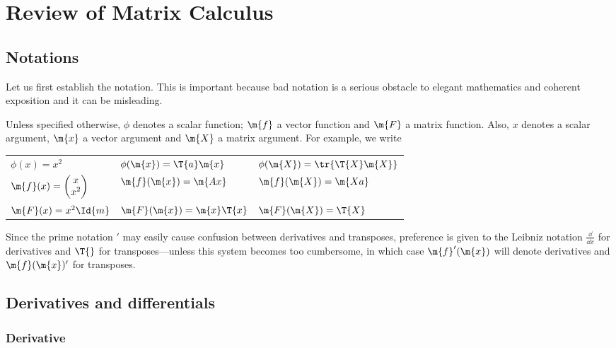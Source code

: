 \chapter{Review of Matrix Calculus}

\section{Notations}

Let us first establish the notation. This is important because bad notation is a serious obstacle to elegant mathematics and coherent exposition and it can be misleading.

Unless specified otherwise, $\phi$ denotes a scalar function; $\m{f}$ a vector function and $\m{F}$ a matrix function. Also, $x$ denotes a scalar argument, $\m{x}$ a vector argument and $\m{X}$ a matrix argument. For example, we write

\begin{table*}[h]
  \begin{center}
  \begin{tabular}{lll}
    $\phi(x)=x^2$     &$\phi(\m{x})=\T{a}\m{x}$       &$\phi(\m{X})=\tr{\T{X}\m{X}}$\\
    $\m{f}(x)=
      \begin{pmatrix}
        x\\
        x^2
      \end{pmatrix}$    &$\m{f}(\m{x})=\m{Ax}$    &$\m{f}(\m{X})=\m{Xa}$\\
      $\m{F}(x)=x^2\Id{m}$  &$\m{F}(\m{x})=\m{x}\T{x}$  &$\m{F}(\m{X})=\T{X}$
  \end{tabular}
\end{center}
\end{table*}

Since the prime notation $'$ may easily cause confusion between derivatives and transposes, preference is given to the Leibniz notation $\frac{\dd}{\dd x}$ for derivatives and $\T{}$ for transposes---unless this system becomes too cumbersome, in which case $\m{f}'(\m{x})$ will denote derivatives and $\m{f}(\m{x})'$ for transposes.

\section{Derivatives and differentials}

\subsection{Derivative}

